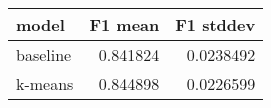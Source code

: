 \begin{tabular}{lrr}
\toprule
 model    &   F1 mean &   F1 stddev \\
\midrule
 baseline &  0.841824 &   0.0238492 \\
 k-means  &  0.844898 &   0.0226599 \\
\bottomrule
\end{tabular}